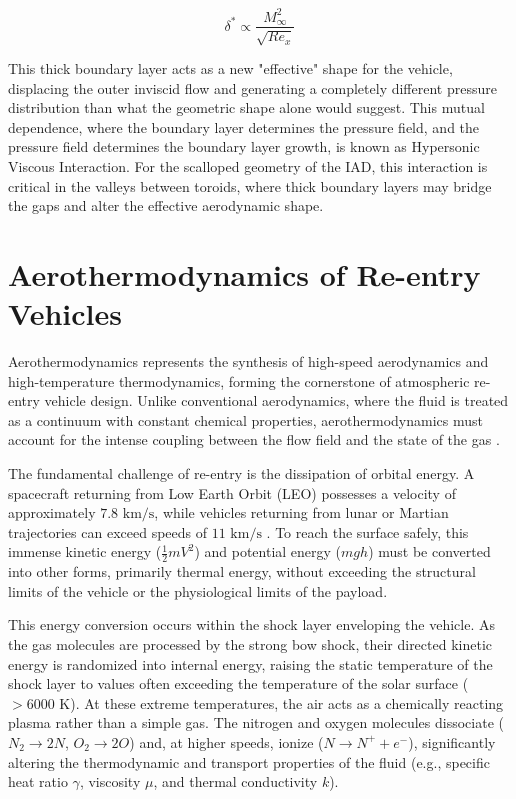 \begin{equation}
    \delta^* \propto \frac{M_{\infty}^2}{\sqrt{Re_x}}
\end{equation}

This thick boundary layer acts as a new "effective" shape for the vehicle, displacing the outer inviscid flow and generating a completely different pressure distribution than what the geometric shape alone would suggest. This mutual dependence, where the boundary layer determines the pressure field, and the pressure field determines the boundary layer growth, is known as Hypersonic Viscous Interaction. For the scalloped geometry of the IAD, this interaction is critical in the valleys between toroids, where thick boundary layers may bridge the gaps and alter the effective aerodynamic shape.


\section{Aerothermodynamics of Re-entry Vehicles}
Aerothermodynamics represents the synthesis of high-speed aerodynamics and high-temperature thermodynamics, forming the cornerstone of atmospheric re-entry vehicle design. Unlike conventional aerodynamics, where the fluid is treated as a continuum with constant chemical properties, aerothermodynamics must account for the intense coupling between the flow field and the state of the gas \cite{AndersonHypersonic}.
\par
The fundamental challenge of re-entry is the dissipation of orbital energy. A spacecraft returning from Low Earth Orbit (LEO) possesses a velocity of approximately $7.8 \text{ km/s}$, while vehicles returning from lunar or Martian trajectories can exceed speeds of $11 \text{ km/s}$ \cite{AndersonHypersonic}. To reach the surface safely, this immense kinetic energy ($\frac{1}{2}mV^2$) and potential energy ($mgh$) must be converted into other forms, primarily thermal energy, without exceeding the structural limits of the vehicle or the physiological limits of the payload.
\par
This energy conversion occurs within the shock layer enveloping the vehicle. As the gas molecules are processed by the strong bow shock, their directed kinetic energy is randomized into internal energy, raising the static temperature of the shock layer to values often exceeding the temperature of the solar surface ($> 6000 \text{ K}$). At these extreme temperatures, the air acts as a chemically reacting plasma rather than a simple gas. The nitrogen and oxygen molecules dissociate ($N_2 \rightarrow 2N$, $O_2 \rightarrow 2O$) and, at higher speeds, ionize ($N \rightarrow N^+ + e^-$), significantly altering the thermodynamic and transport properties of the fluid (e.g., specific heat ratio $\gamma$, viscosity $\mu$, and thermal conductivity $k$).
